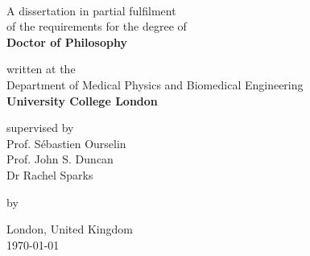 \thispagestyle{empty}
\begin{titlepage}
\addtolength{\wpXoffset}{-21cm}
\addtolength{\wpYoffset}{13.5cm}
%
	\begin{center}
		\vspace*{2.5cm}

		\LARGE{\bfseries \thetitle}\\%
		\vspace*{1cm}

		\normalsize{A dissertation in partial fulfilment}\\%
		\vspace*{0.2cm}
		\normalsize{of the requirements for the degree of}\\%
		\vspace*{0.2cm}
		\large{\bfseries Doctor of Philosophy}%
		\vfill

		\normalsize{written at the}\\%
		\vspace*{0.2cm}
		\large{Department of Medical Physics and Biomedical Engineering}\\%
		\vspace*{0.2cm}
		\large{\bfseries University College London}\\
		\vfill

		\normalsize{supervised by}\\
		\vspace*{0.2cm}
		\large{Prof. Sébastien Ourselin}\\
		\vspace*{0.2cm}
		\large{Prof. John S. Duncan}\\
		\vspace*{0.2cm}
		\large{Dr Rachel Sparks}\\
		\vfill

		\normalsize{by}\\%
		\vspace*{0.2cm}
		{\Large\textit{\theauthor}}

		\vfill
		{
			\large
			London, United Kingdom \\
			\vspace*{0.2cm}
			\today
		}
	\end{center}

\end{titlepage}
